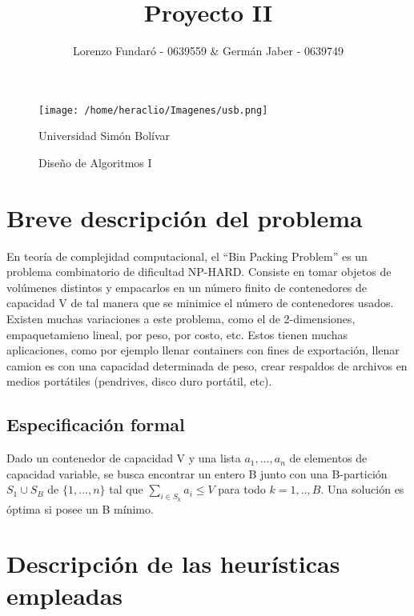 \documentclass[a4paper,10pt]{article}
\title{Proyecto II}
\author{Lorenzo Fundar\'o - 0639559 & Germán Jaber - 0639749}
\begin{document}
\begin{figure}[t]
\begin{center}
\texttt{[image: /home/heraclio/Imagenes/usb.png]}
\end{center}
\begin{center}
\large Universidad Simón Bolívar
\end{center}
\begin{center}
 \large Diseño de Algoritmos I
\end{center}


\end{figure}


\maketitle

\thispagestyle{empty}
\newpage

\tableofcontents{}
\newpage

\section{Breve descripción del problema}

En teoría de complejidad computacional, el ``Bin Packing Problem'' es un problema combinatorio de dificultad NP-HARD. Consiste en tomar 
objetos de volúmenes distintos y empacarlos en un número finito de contenedores de capacidad V de tal manera que se minimice el número 
de contenedores usados. Existen muchas variaciones a este problema, como el de 2-dimensiones, empaquetamieno lineal, por peso, por costo, etc.
Estos tienen muchas aplicaciones, como por ejemplo llenar containers con fines de exportación, llenar camion es con una capacidad determinada 
de peso, crear respaldos de archivos en medios portátiles (pendrives, disco duro portátil, etc). 

\subsection{Especificación formal}

Dado un contenedor de capacidad V y una lista $a_1, ..., a_n$ de elementos de capacidad variable, se busca encontrar un entero 
B junto con una B-partición $S_1 \cup S_B$ de $\{1,...,n\}$ tal que $\sum_{i \in S_k}^{} {a_i \le V}$ para todo $k = 1,..,B$. 
Una solución es óptima si posee un B mínimo. 

\section{Descripción de las heurísticas empleadas}
\end{document}

